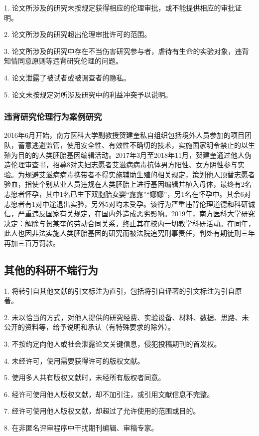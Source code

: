 \documentclass[12pt,hyperref,a4paper,UTF8]{ctexart}
\begin{document}
1.
论文所涉及的研究未按规定获得相应的伦理审批，或不能提供相应的审批证明。

2.
论文所涉及的研究超出伦理审批许可的范围。

3.
论文所涉及的研究中存在不当伤害研究参与者，虐待有生命的实验对象，违背知情同意原则等违背研究伦理的问题。

4.
论文泄露了被试者或被调查者的隐私。

5.
论文未按规定对所涉及研究中的利益冲突予以说明。

\subsubsection{违背研究伦理行为案例研究}

2016年6月开始，南方医科大学副教授贺建奎私自组织包括境外人员参加的项目团队，蓄意逃避监管，使用安全性、有效性不确切的技术，实施国家明令禁止的以生殖为目的的人类胚胎基因编辑活动。2017年3月至2018年11月，贺建奎通过他人伪造伦理审查书，招募8对夫妇志愿者艾滋病病毒抗体男方阳性、女方阴性参与实验。为规避艾滋病病毒携带者不得实施辅助生殖的相关规定，策划他人顶替志愿者验血，指使个别从业人员违规在人类胚胎上进行基因编辑并植入母体，最终有2名志愿者怀孕，其中1名已生下双胞胎女婴“露露”“娜娜”，另1名在怀孕中。其余6对志愿者有1对中途退出实验，另外5对均未受孕。该行为严重违背伦理道德和科研诚信，严重违反国家有关规定，在国内外造成恶劣影响。2019年，南方医科大学研究决定：解除与贺某奎的劳动合同关系，终止其在校内一切教学科研活动。在同年，此人也因非法实施人类胚胎基因的研究而被法院追究刑事责任，判处有期徒刑三年再加三百万罚款。

\subsection{其他的科研不端行为}
1.
将转引自其他文献的引文标注为直引，包括将引自译著的引文标注为引自原著。

2.
未以恰当的方式，对他人提供的研究经费、实验设备、材料、数据、思路、未公开的资料等，给予说明和承认（有特殊要求的除外）。

3.
不按约定向他人或社会泄露论文关键信息，侵犯投稿期刊的首发权。

4.
未经许可，使用需要获得许可的版权文献。

5.
使用多人共有版权文献时，未经所有版权者同意。

6.
经许可使用他人版权文献，却不加引注，或引用文献信息不完整。

7.
经许可使用他人版权文献，却超过了允许使用的范围或目的。

8.
在非匿名评审程序中干扰期刊编辑、审稿专家。
\end{document}

